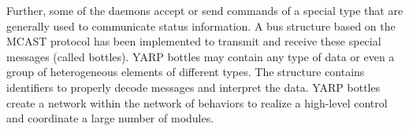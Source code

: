 Further, some of the daemons accept or send commands of a special type
that are generally used to communicate status information. A bus
structure based on the MCAST protocol has been implemented to transmit
and receive these special messages (called bottles). YARP bottles may
contain any type of data or even a group of heterogeneous elements of
different types. The structure contains identifiers to properly decode
messages and interpret the data. YARP bottles create a network within
the network of behaviors to realize a high-level control and
coordinate a large number of modules.


